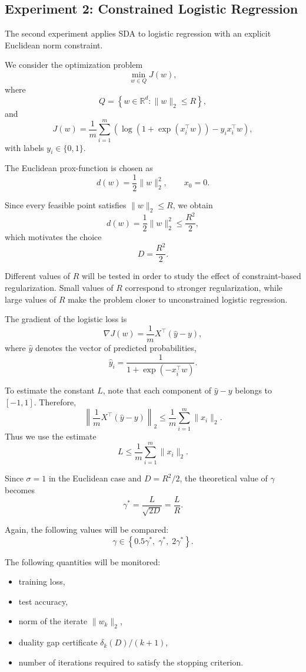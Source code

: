 \documentclass[12pt,a4paper]{article}
\begin{document}
\subsection{Experiment 2: Constrained Logistic Regression}

The second experiment applies SDA to logistic regression with an explicit Euclidean norm constraint.

We consider the optimization problem
\[
\min_{w\in Q} J(w),
\]
where
\[
Q=\left\{w\in\mathbb{R}^d:\|w\|_2\le R\right\},
\]
and
\[
J(w)=\frac1m\sum_{i=1}^m
\left(\log\left(1+\exp(x_i^\top w)\right)-y_i x_i^\top w\right),
\]
with labels $y_i\in\{0,1\}$.

The Euclidean prox-function is chosen as
\[
d(w)=\frac12\|w\|_2^2,
\qquad x_0=0.
\]

Since every feasible point satisfies $\|w\|_2\le R$, we obtain
\[
d(w)=\frac12\|w\|_2^2\le \frac{R^2}{2},
\]
which motivates the choice
\[
D=\frac{R^2}{2}.
\]

Different values of $R$ will be tested in order to study the effect of constraint-based regularization. Small values of $R$ correspond to stronger regularization, while large values of $R$ make the problem closer to unconstrained logistic regression.

The gradient of the logistic loss is
\[
\nabla J(w)=\frac1m X^\top(\hat y-y),
\]
where $\hat y$ denotes the vector of predicted probabilities,
\[
\hat y_i=\frac{1}{1+\exp(-x_i^\top w)}.
\]

To estimate the constant $L$, note that each component of $\hat y-y$ belongs to $[-1,1]$. Therefore,
\[
\left\|\frac1m X^\top(\hat y-y)\right\|_2
\le
\frac1m\sum_{i=1}^m \|x_i\|_2.
\]
Thus we use the estimate
\[
L\le \frac1m\sum_{i=1}^m \|x_i\|_2.
\]

Since $\sigma=1$ in the Euclidean case and $D=R^2/2$, the theoretical value of $\gamma$ becomes
\[
\gamma^*=\frac{L}{\sqrt{2D}}=\frac{L}{R}.
\]

Again, the following values will be compared:
\[
\gamma\in\left\{0.5\gamma^*,\;\gamma^*,\;2\gamma^*\right\}.
\]

The following quantities will be monitored:
\begin{itemize}
\item training loss,
\item test accuracy,
\item norm of the iterate $\|w_k\|_2$,
\item duality gap certificate $\delta_k(D)/(k+1)$,
\item number of iterations required to satisfy the stopping criterion.
\end{itemize}
\end{document}
